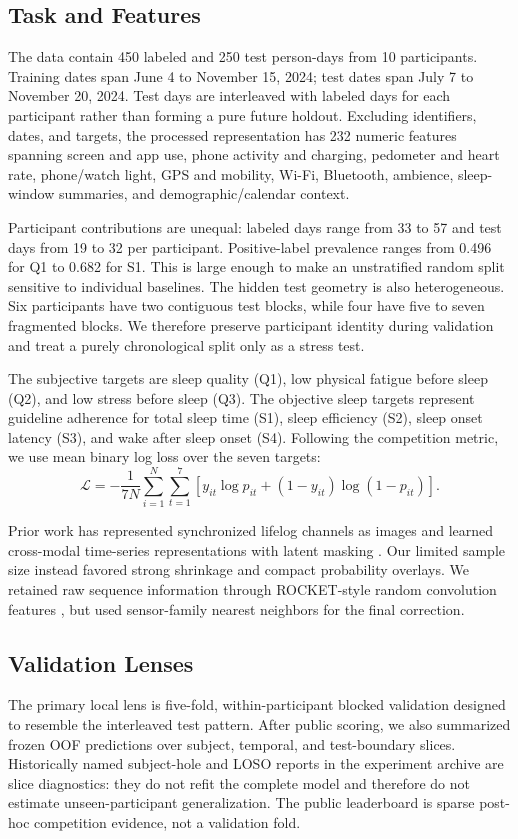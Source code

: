 \documentclass[conference]{IEEEtran}
\begin{document}
\subsection{Task and Features}
The data contain 450 labeled and 250 test person-days from 10 participants. Training dates span June 4 to November 15, 2024; test dates span July 7 to November 20, 2024. Test days are interleaved with labeled days for each participant rather than forming a pure future holdout. Excluding identifiers, dates, and targets, the processed representation has 232 numeric features spanning screen and app use, phone activity and charging, pedometer and heart rate, phone/watch light, GPS and mobility, Wi-Fi, Bluetooth, ambience, sleep-window summaries, and demographic/calendar context.

Participant contributions are unequal: labeled days range from 33 to 57 and test days from 19 to 32 per participant. Positive-label prevalence ranges from 0.496 for Q1 to 0.682 for S1. This is large enough to make an unstratified random split sensitive to individual baselines. The hidden test geometry is also heterogeneous. Six participants have two contiguous test blocks, while four have five to seven fragmented blocks. We therefore preserve participant identity during validation and treat a purely chronological split only as a stress test.

The subjective targets are sleep quality (Q1), low physical fatigue before sleep (Q2), and low stress before sleep (Q3). The objective sleep targets represent guideline adherence for total sleep time (S1), sleep efficiency (S2), sleep onset latency (S3), and wake after sleep onset (S4). Following the competition metric, we use mean binary log loss over the seven targets:
\begin{equation}
\mathcal{L}=-\frac{1}{7N}\sum_{i=1}^{N}\sum_{t=1}^{7}
\left[y_{it}\log p_{it}+(1-y_{it})\log(1-p_{it})\right].
\end{equation}

Prior work has represented synchronized lifelog channels as images \cite{na2025pixleep} and learned cross-modal time-series representations with latent masking \cite{deldari2024crossl}. Our limited sample size instead favored strong shrinkage and compact probability overlays. We retained raw sequence information through ROCKET-style random convolution features \cite{dempster2020rocket}, but used sensor-family nearest neighbors for the final correction.

\subsection{Validation Lenses}
The primary local lens is five-fold, within-participant blocked validation designed to resemble the interleaved test pattern. After public scoring, we also summarized frozen OOF predictions over subject, temporal, and test-boundary slices. Historically named subject-hole and LOSO reports in the experiment archive are slice diagnostics: they do not refit the complete model and therefore do not estimate unseen-participant generalization. The public leaderboard is sparse post-hoc competition evidence, not a validation fold.
\end{document}
